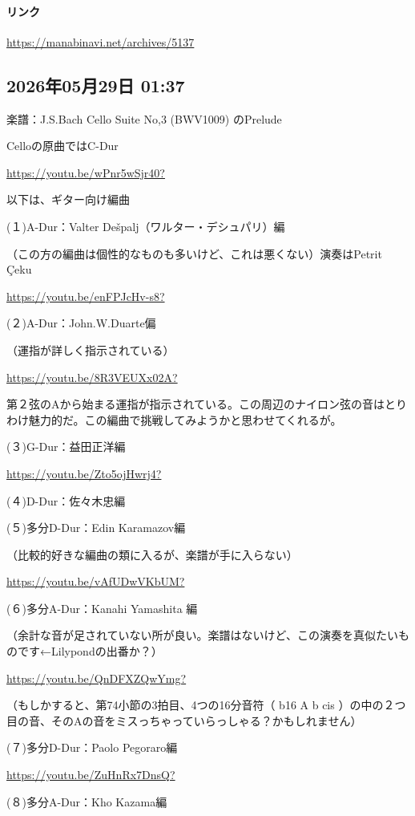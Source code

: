 \paragraph{リンク}
\url{https://manabinavi.net/archives/5137}

\subsection*{2026年05月29日 01:37}

楽譜：J.S.Bach Cello Suite No,3 (BWV1009) のPrelude

Celloの原曲ではC-Dur

\url{https://youtu.be/wPnr5wSjr40?}

以下は、ギター向け編曲

(１)A-Dur：Valter Dešpalj（ワルター・デシュパリ）編

（この方の編曲は個性的なものも多いけど、これは悪くない）演奏はPetrit Çeku

\url{https://youtu.be/enFPJcHv-s8?}

(２)A-Dur：John.W.Duarte偏

（運指が詳しく指示されている）

\url{https://youtu.be/8R3VEUXx02A?}

第２弦のAから始まる運指が指示されている。この周辺のナイロン弦の音はとりわけ魅力的だ。この編曲で挑戦してみようかと思わせてくれるが。

(３)G-Dur：益田正洋編

\url{https://youtu.be/Zto5ojHwrj4?}

(４)D-Dur：佐々木忠編

(５)多分D-Dur：Edin Karamazov編

（比較的好きな編曲の類に入るが、楽譜が手に入らない）

\url{https://youtu.be/vAfUDwVKbUM?}

(６)多分A-Dur：Kanahi Yamashita 編

（余計な音が足されていない所が良い。楽譜はないけど、この演奏を真似たいものです←Lilypondの出番か？）

\url{https://youtu.be/QnDFXZQwYmg?}

（もしかすると、第74小節の3拍目、4つの16分音符（ b16 A b cis ）の中の２つ目の音、そのAの音をミスっちゃっていらっしゃる？かもしれません）

(７)多分D-Dur：Paolo Pegoraro編

\url{https://youtu.be/ZuHnRx7DnsQ?}

(８)多分A-Dur：Kho Kazama編

